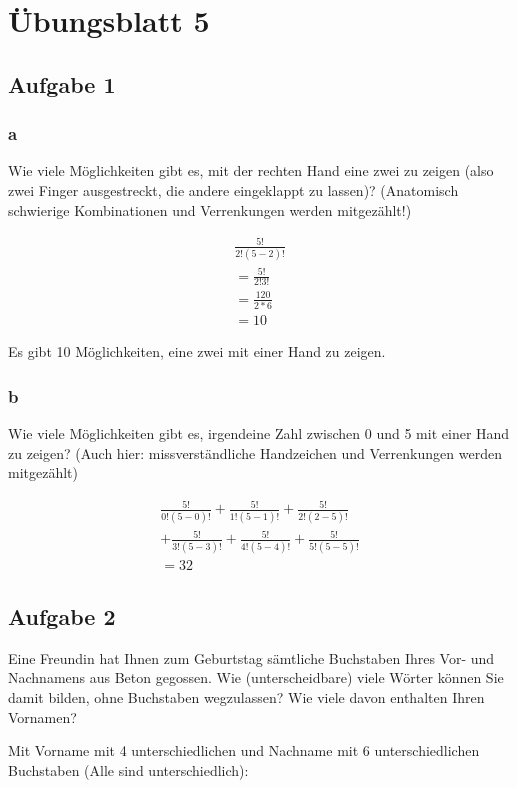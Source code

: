 \chapter{Übungsblatt 5}

\section{Aufgabe 1}

\subsection{a} 
Wie viele Möglichkeiten gibt es, mit der rechten Hand eine zwei zu zeigen (also zwei Finger ausgestreckt, die andere eingeklappt zu lassen)? (Anatomisch schwierige Kombinationen und Verrenkungen werden mitgezählt!)

\begin{align*}
    \frac{5!}{2!(5-2)!} \\
    = \frac{5!}{2!3!} \\
    = \frac{120}{2*6} \\
    = 10
\end{align*}

Es gibt 10 Möglichkeiten, eine zwei mit einer Hand zu zeigen.

\subsection{b}
Wie viele Möglichkeiten gibt es, irgendeine Zahl zwischen 0 und 5 mit einer Hand zu zeigen? (Auch hier: missverständliche Handzeichen und Verrenkungen werden mitgezählt)

\begin{align*}
    \frac{5!}{0!(5-0)!} + \frac{5!}{1!(5-1)!} + \frac{5!}{2!(2-5)!}\\
     + \frac{5!}{3!(5-3)!} + \frac{5!}{4!(5-4)!} + \frac{5!}{5!(5-5)!} \\
     = 32
\end{align*}

\section{Aufgabe 2}
Eine Freundin hat Ihnen zum Geburtstag sämtliche Buchstaben Ihres Vor- und Nachnamens aus Beton gegossen. Wie (unterscheidbare) viele Wörter können Sie damit bilden, ohne Buchstaben wegzulassen? Wie viele davon enthalten Ihren Vornamen?

Mit Vorname mit 4 unterschiedlichen und Nachname mit 6 unterschiedlichen Buchstaben (Alle sind unterschiedlich):

